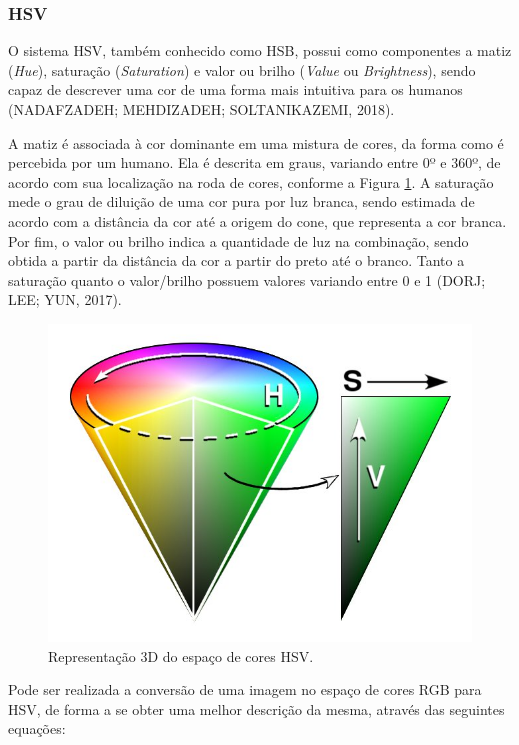 \subsubsection{HSV}

O sistema HSV, também conhecido como HSB, possui como componentes a matiz (\textit{Hue}), saturação (\textit{Saturation}) e valor ou brilho (\textit{Value} ou \textit{Brightness}), sendo capaz de descrever uma cor de uma forma mais intuitiva para os humanos (NADAFZADEH; MEHDIZADEH; SOLTANIKAZEMI, 2018).

A matiz é associada à cor dominante em uma mistura de cores, da forma como é percebida por um humano. Ela é descrita em graus, variando entre 0º e 360º, de acordo com sua localização na roda de cores, conforme a Figura \ref{img:hsv_hex}. A saturação mede o grau de diluição de uma cor pura por luz branca, sendo estimada de acordo com a distância da cor até a origem do cone, que representa a cor branca. Por fim, o valor ou brilho indica a quantidade de luz na combinação, sendo obtida a partir da distância da cor a partir do preto até o branco. Tanto a saturação quanto o valor/brilho possuem valores variando entre 0 e 1 (DORJ; LEE; YUN, 2017).

\begin{figure}[H]
\centering
    \caption{\label{img:hsv_hex} Representação 3D do espaço de cores HSV.}
    \includegraphics[scale=0.25]{img/hsv_hex}
\end{figure}

Pode ser realizada a conversão de uma imagem no espaço de cores RGB para HSV, de forma a se obter uma melhor descrição da mesma, através das seguintes equações: 

